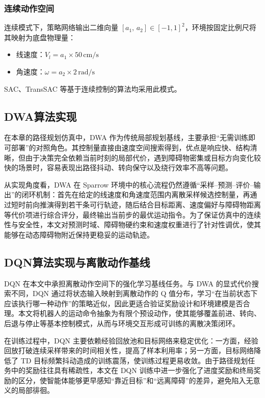 \subsubsection{连续动作空间}

连续模式下，策略网络输出二维向量 $[a_1,\,a_2]\in[-1,1]^2$，环境按固定比例尺将其映射为底盘物理量：
\begin{itemize}
    \item 线速度：$V_l = a_1 \times 50\,\text{cm/s}$
    \item 角速度：$\omega = a_2 \times 2\,\text{rad/s}$
\end{itemize}
SAC、TransSAC 等基于连续控制的算法均采用此模式。

\subsection{DWA算法实现}
在本章的路径规划仿真中，DWA 作为传统局部规划基线，主要承担“无需训练即可部署”的对照角色。其控制量直接由速度空间搜索得到，优点是响应快、结构清晰，但由于决策完全依赖当前时刻的局部代价，遇到障碍物密集或目标方向变化较快的场景时，容易表现出路径抖动、转向保守以及绕行效率不高等问题。

从实现角度看，DWA 在 Sparrow 环境中的核心流程仍然遵循“采样--预测--评价--输出”的闭环机制：首先在给定的线速度和角速度范围内离散采样候选控制量，再通过短时前向推演得到若干条可行轨迹，随后结合目标距离、速度偏好与障碍物距离等代价项进行综合评分，最终输出当前步的最优运动指令。为了保证仿真中的连续性与安全性，本文对预测时域、障碍物硬约束和速度权重进行了针对性调优，使其能够在动态障碍物附近保持更稳妥的运动轨迹。

\subsection{DQN算法实现与离散动作基线}

DQN 在本文中承担离散动作空间下的强化学习基线任务。与 DWA 的显式代价搜索不同，DQN 通过将状态输入映射到离散动作的 Q 值分布，学习“在当前状态下应该执行哪一种动作”的策略近似，因此更适合验证奖励设计和环境建模是否合理。本文将机器人的运动命令抽象为有限个预设动作，使其能够覆盖前进、转向、后退与停止等基本控制模式，从而与环境交互形成可训练的离散决策闭环。

在训练过程中，DQN 主要依赖经验回放池和目标网络来稳定优化：一方面，经验回放打破连续采样带来的时间相关性，提高了样本利用率；另一方面，目标网络降低了 TD 目标频繁抖动造成的训练震荡，使训练过程更易收敛。由于路径规划任务中的奖励往往具有稀疏性，本文在 DQN 训练中进一步强化了进度奖励和终局奖励的区分，使智能体能够更早感知“靠近目标”和“远离障碍”的差异，避免陷入无意义的局部徘徊。

